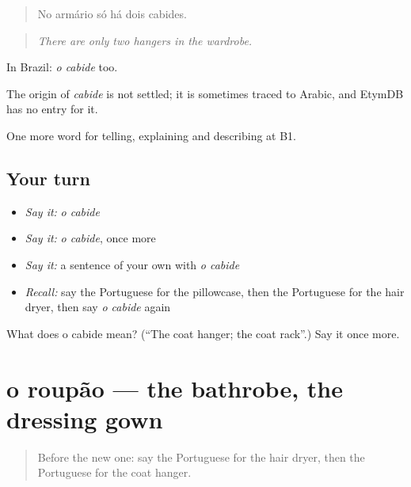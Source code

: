 \begin{quote}
No armário só há dois cabides.
\end{quote}

\begin{quote}
\emph{There are only two hangers in the wardrobe.}
\end{quote}

In Brazil: \emph{o cabide} too.

\begin{cousinweb}
The origin of \emph{cabide} is not settled; it is sometimes traced to Arabic, and EtymDB has no entry for it.
\end{cousinweb}

\begin{grammarlens}[title={What you've built}]
One more word for telling, explaining and describing at B1.
\end{grammarlens}

\subsection*{Your turn}
\begin{itemize}
\raggedright
  \item \emph{Say it:} \emph{o cabide}
  \item \emph{Say it:} \emph{o cabide}, once more
  \item \emph{Say it:} a sentence of your own with \emph{o cabide}
  \item \emph{Recall:} say the Portuguese for the pillowcase, then the Portuguese for the hair dryer, then say \emph{o cabide} again
\end{itemize}

\begin{tcolorbox}[breakable,colback=teal!4,colframe=teal!35!black,title={Before you move on}]
What does o cabide mean? (\textquotedblleft{}The coat hanger; the coat rack\textquotedblright{}.) Say it once more.
\end{tcolorbox}
\section[o roupão]{o roupão — the bathrobe, the dressing gown}

\label{lesson:PT-C429-roupao}



\begin{quote}
Before the new one: say the Portuguese for the hair dryer, then the Portuguese for the coat hanger.
\end{quote}

